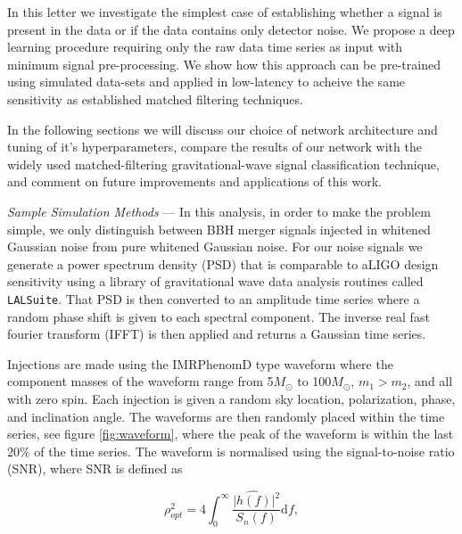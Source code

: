 \documentclass[%
 amsmath,amssymb,
 aps,
 twocolumn,
 prl,
 reprint,
floatfix,
]{revtex4-1}
\begin{document}
%
%
In this letter we investigate the simplest case of establishing whether a
signal is present in the data or if the data contains only detector noise. We
propose a deep learning procedure requiring only the raw data time
series as input with minimum signal pre-processing. We show how this approach
can be pre-trained using simulated data-sets and applied in low-latency 
to acheive the same sensitivity as established matched filtering techniques. 

%
% 
In the following sections we will discuss our choice of network architecture
and tuning of it's hyperparameters, compare the results of our network with the
widely used matched-filtering gravitational-wave signal classification
technique, and comment on future improvements and applications of this work.      

%
%
\textit{Sample Simulation Methods} --- In this analysis, in order to make the
problem simple, we only distinguish between BBH merger signals injected in
whitened Gaussian noise from pure whitened Gaussian noise. For our noise
signals we generate a power spectrum density (PSD) that is comparable to aLIGO
design sensitivity using a library of gravitational wave data analysis routines
called \texttt{LALSuite}. That PSD is then converted to an amplitude time
series where a random phase shift is given to each spectral component. The
inverse real fast fourier transform (IFFT) is then applied and returns a
Gaussian time series.

Injections are made using the IMRPhenomD type waveform
\cite{PhysRevD.93.044006, PhysRevD.93.044007} where the component masses of the
waveform range from 5\(M_\odot\) to 100\(M_\odot\), $m_{1} > m_{2}$, and all
with zero spin. Each injection is given a random sky location, polarization,
phase, and inclination angle. The waveforms are then randomly placed within the
time series, see figure \ref{fig:waveform}, where the peak of the waveform is
within the last $20$\% of the time series. The waveform is normalised using the
signal-to-noise ratio (SNR), where SNR is defined as

\begin{equation} \label{eq:snr}
\rho_{opt}^{2} = 4 \int_{0}^{\infty} \frac{\lvert \hat{h(f)}\rvert^{2}}{S_{n}(f)} \mathrm{d}f,
\end{equation}
\end{document}

